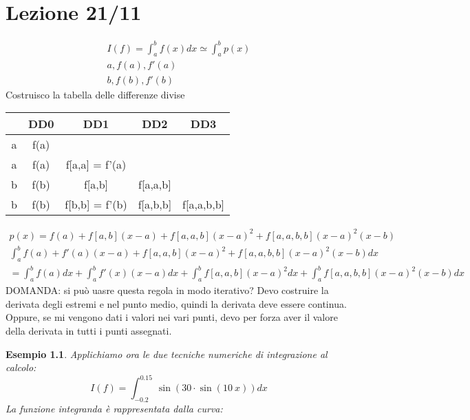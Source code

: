 \documentclass[a4paper, portrait]{book}
\numberwithin{equation}{chapter} %
\newtheorem{example}{Esempio}
\begin{document}
\chapter{Lezione 21/11}
\begin{gather}
    I(f) = \int_a^b f(x) dx \simeq \int_a^b p(x)\\
    a,f(a),f'(a)\\
    b,f(b),f'(b)
\end{gather}
Costruisco la tabella delle differenze divise
\begin{center}
    \begin{tabular}{|c|c|c|c|c|}
        \hline
        &DD0&DD1&DD2&DD3\\
        \hline   
        a&f(a)&&&\\
        a&f(a)&f[a,a] = f'(a)&&\\
        b&f(b)&f[a,b]&f[a,a,b]&\\
        b&f(b)&f[b,b] = f'(b)&f[a,b,b]&f[a,a,b,b]\\
        \hline 
    \end{tabular}    
\end{center}
\begin{gather}
    p(x) = f(a) + f[a,b] (x-a) +f[a,a,b](x-a)^2 + f[a,a,b,b](x-a)^2(x-b)\\
    \int_a^b f(a) + f'(a)(x-a) + f[a,a,b](x-a)^2 + f[a,a,b,b](x-a)^2(x-b) dx\\
    = \int_a^b f(a) dx + \int_a^b f'(x) (x-a) dx + \int_a^b f[a,a,b](x-a)^2 dx + \int_a^b f[a,a,b,b](x-a)^2 (x-b) dx
\end{gather}
DOMANDA: si può uasre questa regola in modo iterativo? Devo costruire la derivata degli estremi e nel punto medio, quindi la derivata deve essere continua.\\
Oppure, se mi vengono dati i valori nei vari punti, devo per forza aver il valore della derivata in tutti i punti assegnati.
\newpage
\begin{example}
    Applichiamo ora le due tecniche numeriche di integrazione al calcolo:
    \begin{equation}
        I(f) = \int_{-0.2}^{0.15} \sin (30 \cdot \sin(10 \ x)) dx
    \end{equation}
    La funzione integranda è rappresentata dalla curva:
    \begin{figure}[h!]
        \centering
        \\
        \caption{}
    \end{figure}
\end{example}
\end{document}
